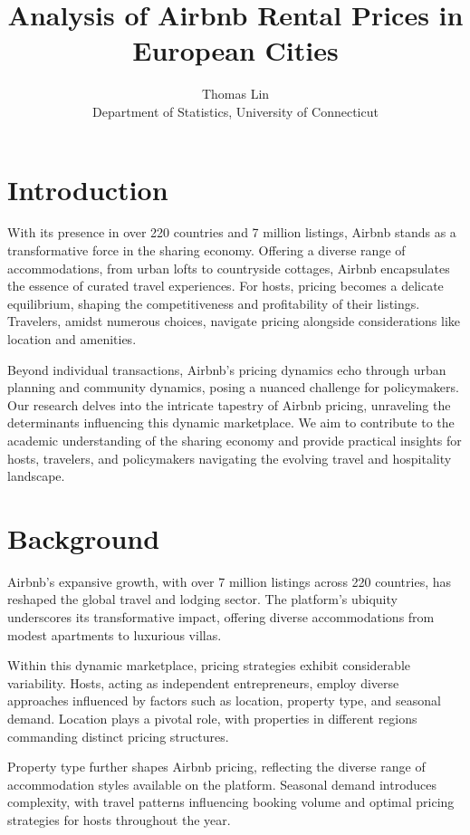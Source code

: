 \documentclass[12pt, letterpaper]{article}
\begin{document}
\title{Analysis of Airbnb Rental Prices in European Cities}
\author{Thomas Lin\\
Department of Statistics, University of Connecticut}
\maketitle

\section*{Introduction}
With its presence in over 220 countries and 7 million listings, Airbnb stands as a transformative force in the sharing economy. Offering a diverse range of accommodations, from urban lofts to countryside cottages, Airbnb encapsulates the essence of curated travel experiences. For hosts, pricing becomes a delicate equilibrium, shaping the competitiveness and profitability of their listings. Travelers, amidst numerous choices, navigate pricing alongside considerations like location and amenities.

Beyond individual transactions, Airbnb's pricing dynamics echo through urban planning and community dynamics, posing a nuanced challenge for policymakers. Our research delves into the intricate tapestry of Airbnb pricing, unraveling the determinants influencing this dynamic marketplace. We aim to contribute to the academic understanding of the sharing economy and provide practical insights for hosts, travelers, and policymakers navigating the evolving travel and hospitality landscape.

\section*{Background}
Airbnb's expansive growth, with over 7 million listings across 220 countries, has reshaped the global travel and lodging sector. The platform's ubiquity underscores its transformative impact, offering diverse accommodations from modest apartments to luxurious villas.

Within this dynamic marketplace, pricing strategies exhibit considerable variability. Hosts, acting as independent entrepreneurs, employ diverse approaches influenced by factors such as location, property type, and seasonal demand. Location plays a pivotal role, with properties in different regions commanding distinct pricing structures.

Property type further shapes Airbnb pricing, reflecting the diverse range of accommodation styles available on the platform. Seasonal demand introduces complexity, with travel patterns influencing booking volume and optimal pricing strategies for hosts throughout the year.
\end{document}
